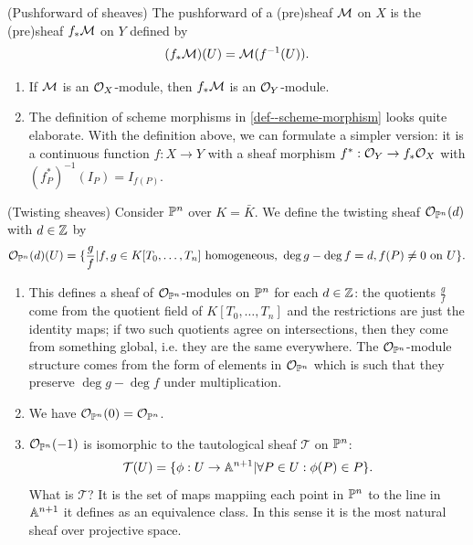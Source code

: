 \documentclass[a4paper,11pt]{article}
\begin{document}
			\begin{defi}(Pushforward of sheaves)
				The pushforward of a (pre)sheaf $\M$ on $X$ is the (pre)sheaf $f_\ast\M$ on $Y$ defined by 
				\begin{equation*}
					(f_\ast\M)(U)=\M(f^{-1}(U)).
				\end{equation*}
			\end{defi}

			\begin{remark}
				\begin{enumerate}
					\item If $\M$ is an $\O_X$-module, then $f_\ast\M$ is an $\O_Y$-module.
					\item The definition of scheme morphisms in \autoref{def--scheme-morphism} looks quite elaborate. With the definition above, we can formulate a simpler version: it is a continuous function $f:X\rightarrow Y$ with a sheaf morphism $f^\ast:\O_Y\rightarrow f_\ast\O_X$ with $(f^\ast_P)^{-1}(I_P)=I_{f(P)}$.
				\end{enumerate}
			\end{remark}

			\begin{eg}(Twisting sheaves)
				Consider $\P^n$ over $K=\bar{K}$. We define the twisting sheaf $\O_{\P^n}(d)$ with $d\in\Z$ by
				\begin{equation*}
					\O_{\P^n}(d)(U)=\{\frac{g}{f}|f,g\in K[T_0,\dots,T_n]\text{ homogeneous, }\deg g-\deg f=d,f(P)\neq0\text{ on }U\}.
				\end{equation*}
				\begin{enumerate}
					\item This defines a sheaf of $\O_{\P^n}$-modules on $\P^n$ for each $d\in\Z$: the quotients $\frac{g}{f}$ come from the quotient field of $K[T_0,\dots,T_n]$ and the restrictions are just the identity maps; if two such quotients agree on intersections, then they come from something global, i.e. they are the same everywhere. The $\O_{\P^n}$-module structure comes from the form of elements in $\O_{\P^n}$ which is such that they preserve $\deg g-\deg f$ under multiplication.
					\item We have $\O_{\P^n}(0)=\O_{\P^n}$.
					\item $\O_{\P^n}(-1)$ is isomorphic to the tautological sheaf $\mathcal{T}$ on $\P^n$:
						\begin{equation*}
							\mathcal{T}(U)=\{\phi:U\rightarrow\AA^{n+1}|\forall P\in U:\phi(P)\in P\}.
						\end{equation*}
						What is $\mathcal{T}$? It is the set of maps mappiing each point in $\P^n$ to the line in $\AA^{n+1}$ it defines as an equivalence class. In this sense it is the most natural sheaf over projective space. 
				\end{enumerate}
			\end{eg}
\end{document}
